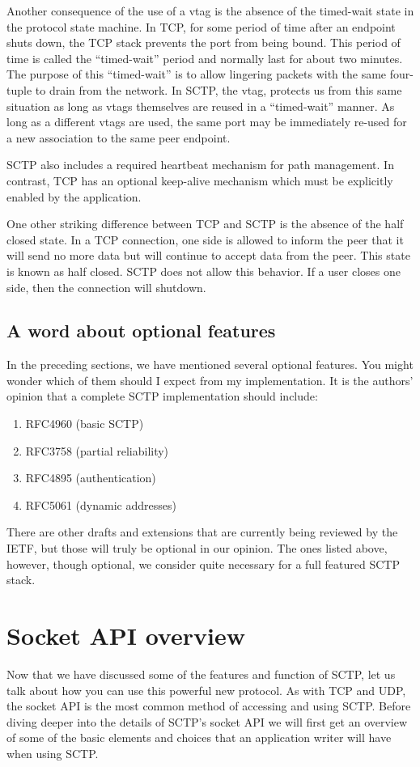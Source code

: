 \documentclass[conference]{IEEEtran}
\begin{document}
Another consequence of the use of a vtag is the absence of 
the timed-wait state in the protocol state machine. In TCP, for
some period of time after an endpoint shuts down, the TCP stack
prevents the port from being bound. This period of time is called
the ``timed-wait'' period and normally last for about two minutes. 
The purpose of this ``timed-wait'' is to allow lingering packets with
the same four-tuple to drain from the network. In SCTP, the vtag,
protects us from this same situation as long as vtags themselves are
reused in a ``timed-wait'' manner.  As long as a different vtags are used, the same
port may be immediately re-used for a new association to the same
peer endpoint.

SCTP also includes a required heartbeat mechanism for path
management. In contrast, TCP has an optional keep-alive mechanism
which must be explicitly enabled by the application. 

One other striking difference between TCP and SCTP is the absence
of the half closed state. In a TCP connection, one side is allowed to
inform the peer that it will send no more data but will continue to accept
data from the peer. This state is known as half closed. SCTP does not
allow this behavior. If a user closes one side, then the connection will
shutdown.

\subsection{A word about optional features}
\label{options}
In the preceding sections, we have mentioned several optional
features. You might wonder which of them should I expect from
my implementation. It is the authors' opinion that a complete 
SCTP implementation should include:
\begin{enumerate}
 \item  RFC4960 (basic SCTP)
 \item  RFC3758 (partial reliability)
 \item  RFC4895 (authentication)
 \item  RFC5061 (dynamic addresses)
\end{enumerate}

There are other drafts and extensions that are currently being
reviewed by the IETF, but those will truly be optional in our
opinion. The ones listed above, however, though optional, we
consider quite necessary for a full featured SCTP stack.

\section{Socket API overview}
Now that we have discussed some of the features and function of SCTP, let us
talk about how you can use this powerful new protocol. As with TCP and UDP, the socket
API is the most common method of accessing and using SCTP. Before diving deeper
into the details of SCTP's socket API we will first get an overview of some of the
basic elements and choices that an application writer will have when using
SCTP.
\end{document}
